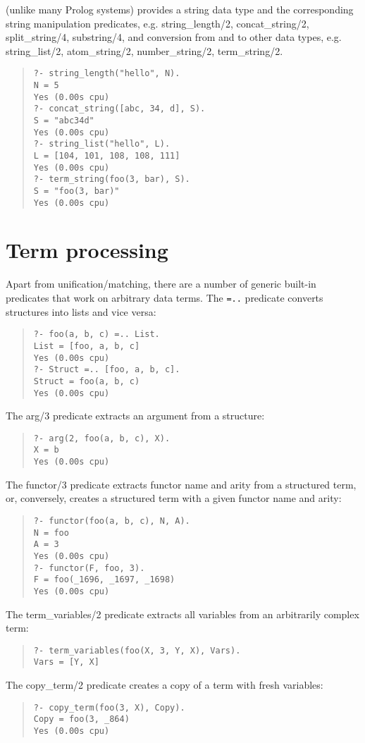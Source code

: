 \eclipse{} (unlike many Prolog systems) provides a string data type
and the corresponding string manipulation predicates, e.g.
string_length/2, concat_string/2, split_string/4, substring/4,
and conversion from and to other data types, e.g.
string_list/2, atom_string/2, number_string/2, term_string/2.
\begin{quote}\begin{verbatim}
?- string_length("hello", N).
N = 5
Yes (0.00s cpu)
?- concat_string([abc, 34, d], S).
S = "abc34d"
Yes (0.00s cpu)
?- string_list("hello", L).
L = [104, 101, 108, 108, 111]
Yes (0.00s cpu)
?- term_string(foo(3, bar), S).
S = "foo(3, bar)"
Yes (0.00s cpu)
\end{verbatim}\end{quote}


\section{Term processing}

Apart from unification/matching, there are a number of generic built-in
predicates that work on arbitrary data terms.
The \verb/=../ predicate converts structures into lists and vice versa:
\begin{quote}\begin{verbatim}
?- foo(a, b, c) =.. List.
List = [foo, a, b, c]
Yes (0.00s cpu)
?- Struct =.. [foo, a, b, c].
Struct = foo(a, b, c)
Yes (0.00s cpu)
\end{verbatim}\end{quote}
The arg/3 predicate extracts an argument from a structure:
\begin{quote}\begin{verbatim}
?- arg(2, foo(a, b, c), X).
X = b
Yes (0.00s cpu)
\end{verbatim}\end{quote}
The functor/3 predicate extracts functor name and arity from a structured term,
or, conversely, creates a structured term with a given functor name and arity:
\begin{quote}\begin{verbatim}
?- functor(foo(a, b, c), N, A).
N = foo
A = 3
Yes (0.00s cpu)
?- functor(F, foo, 3).
F = foo(_1696, _1697, _1698)
Yes (0.00s cpu)
\end{verbatim}\end{quote}
The term_variables/2 predicate extracts all variables from an arbitrarily
complex term:
\begin{quote}\begin{verbatim}
?- term_variables(foo(X, 3, Y, X), Vars).
Vars = [Y, X]
\end{verbatim}\end{quote}
The copy_term/2 predicate creates a copy of a term with fresh variables:
\begin{quote}\begin{verbatim}
?- copy_term(foo(3, X), Copy).
Copy = foo(3, _864)
Yes (0.00s cpu)
\end{verbatim}\end{quote}


